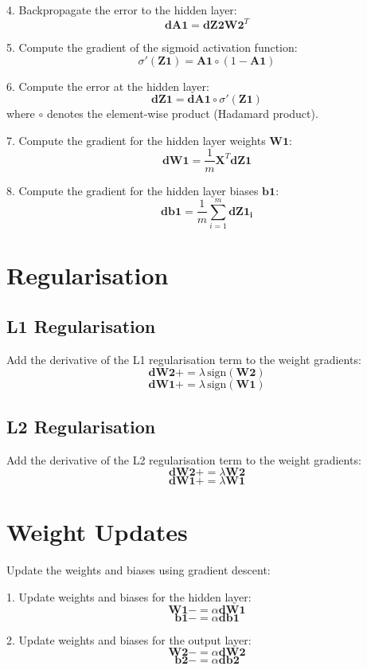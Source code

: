 \documentclass{article}
\begin{document}
	4. Backpropagate the error to the hidden layer:
	\[
	\mathbf{dA1} = \mathbf{dZ2} \mathbf{W2}^T
	\]
	
	5. Compute the gradient of the sigmoid activation function:
	\[
	\sigma'(\mathbf{Z1}) = \mathbf{A1} \circ (1 - \mathbf{A1})
	\]
	
	6. Compute the error at the hidden layer:
	\[
	\mathbf{dZ1} = \mathbf{dA1} \circ \sigma'(\mathbf{Z1})
	\]
	where $\circ$ denotes the element-wise product (Hadamard product).
	
	7. Compute the gradient for the hidden layer weights $\mathbf{W1}$:
	\[
	\mathbf{dW1} = \frac{1}{m} \mathbf{X}^T \mathbf{dZ1}
	\]
	
	8. Compute the gradient for the hidden layer biases $\mathbf{b1}$:
	\[
	\mathbf{db1} = \frac{1}{m} \sum_{i=1}^{m} \mathbf{dZ1_i}
	\]
	
	\section*{Regularisation}
	
	\subsection*{L1 Regularisation}
	Add the derivative of the L1 regularisation term to the weight gradients:
	\[
	\mathbf{dW2} += \lambda \, \text{sign}(\mathbf{W2})
	\]
	\[
	\mathbf{dW1} += \lambda \, \text{sign}(\mathbf{W1})
	\]
	
	\subsection*{L2 Regularisation}
	Add the derivative of the L2 regularisation term to the weight gradients:
	\[
	\mathbf{dW2} += \lambda \mathbf{W2}
	\]
	\[
	\mathbf{dW1} += \lambda \mathbf{W1}
	\]
	
	\section*{Weight Updates}
	
	Update the weights and biases using gradient descent:
	
	1. Update weights and biases for the hidden layer:
	\[
	\mathbf{W1} -= \alpha \mathbf{dW1}
	\]
	\[
	\mathbf{b1} -= \alpha \mathbf{db1}
	\]
	
	2. Update weights and biases for the output layer:
	\[
	\mathbf{W2} -= \alpha \mathbf{dW2}
	\]
	\[
	\mathbf{b2} -= \alpha \mathbf{db2}
	\]
	
\end{document}

